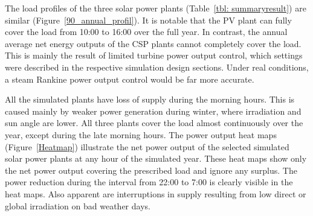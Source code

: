 The load profiles of the three solar power plants (Table~\ref{tbl: summaryresult}) are similar (Figure~\ref{90_annual_profil}). It is notable that the PV plant can fully cover the load from 10:00 to 16:00 over the full year. In contrast, the annual average net energy outputs of the CSP plants cannot completely cover the load. This is mainly the result of limited turbine power output control, which settings were described in the respective simulation design sections. Under real conditions, a steam Rankine power output control would be far more accurate. 


All the simulated plants have loss of supply during the morning hours. This is caused mainly by weaker power generation during winter, where irradiation and sun angle are lower. All three plants cover the load almost continuously over the year, except during the late morning hours. The power output heat maps (Figure~\ref{Heatmap}) illustrate the net power output of the selected simulated solar power plants at any hour of the simulated year. These heat maps show only the net power output covering the prescribed load and ignore any surplus. The power reduction during the interval from 22:00 to 7:00 is clearly visible in the heat maps. Also apparent are interruptions in supply resulting from low direct or global irradiation on bad weather days. 


